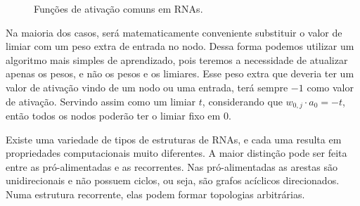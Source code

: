 \begin{figure}[ht]
 \begin{center}
 \end{center}
 \caption{Funções de ativação comuns em RNAs.}
 \label{fig:func:rna}
\end{figure}

Na maioria dos casos, será matematicamente conveniente substituir o valor de limiar com um peso extra de entrada no nodo. Dessa forma podemos utilizar um algoritmo mais simples de aprendizado, pois teremos a necessidade de atualizar apenas os pesos, e não os pesos e os limiares. Esse peso extra que deveria ter um valor de ativação vindo de um nodo ou uma entrada, terá sempre $-1$ como valor de ativação. Servindo assim como um limiar $t$, considerando que $w_{0,j} \cdot a_0 = -t$, então todos os nodos poderão ter o limiar fixo em 0.

Existe uma variedade de tipos de estruturas de RNAs, e cada uma resulta em propriedades computacionais muito diferentes. A maior distinção pode ser feita entre as pró-alimentadas e as recorrentes. Nas pró-alimentadas as arestas são unidirecionais e não possuem ciclos, ou seja, são grafos acíclicos direcionados. Numa estrutura recorrente, elas podem formar topologias arbitrárias.

